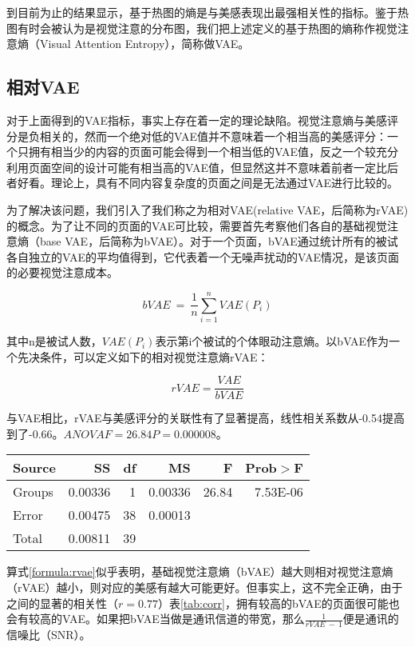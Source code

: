 到目前为止的结果显示，基于热图的熵是与美感表现出最强相关性的指标。鉴于热图有时会被认为是视觉注意的分布图，我们把上述定义的基于热图的熵称作视觉注意熵（Visual Attention Entropy），简称做VAE。

\subsection{相对VAE}
对于上面得到的VAE指标，事实上存在着一定的理论缺陷。视觉注意熵与美感评分是负相关的，然而一个绝对低的VAE值并不意味着一个相当高的美感评分：一个只拥有相当少的内容的页面可能会得到一个相当低的VAE值，反之一个较充分利用页面空间的设计可能有相当高的VAE值，但显然这并不意味着前者一定比后者好看。理论上，具有不同内容复杂度的页面之间是无法通过VAE进行比较的。

为了解决该问题，我们引入了我们称之为相对VAE(relative VAE，后简称为rVAE)的概念。为了让不同的页面的VAE可比较，需要首先考察他们各自的基础视觉注意熵（base VAE，后简称为bVAE）。对于一个页面，bVAE通过统计所有的被试各自独立的VAE的平均值得到，它代表着一个无噪声扰动的VAE情况，是该页面的必要视觉注意成本。

$$bVAE~=~\frac{1}{n}\sum_{i=1}^n VAE(P_i)$$

其中n是被试人数，$VAE(P_i)$表示第i个被试的个体眼动注意熵。以bVAE作为一个先决条件，可以定义如下的相对视觉注意熵rVAE：

\begin{equation}
rVAE = \frac{VAE}{bVAE}
\label{formula:rvae}
\end{equation}

与VAE相比，rVAE与美感评分的关联性有了显著提高，线性相关系数从-0.54提高到了-0.66。$ANOVA F = 26.84 P = 0.000008$。

\begin{table}[H]
\centering
\begin{tabular}{lrrrrr}
  \hline
  Source&SS&df&MS&F&Prob$>$F\\ \hline
  Groups&0.00336&1&0.00336&26.84&7.53E-06\\
  Error&0.00475&38&0.00013&&\\
  Total&0.00811&39&&&\\
  \hline
\end{tabular}
\end{table}

算式\ref{formula:rvae}似乎表明，基础视觉注意熵（bVAE）越大则相对视觉注意熵（rVAE）越小，则对应的美感有越大可能更好。但事实上，这不完全正确，由于之间的显著的相关性（$r = 0.77$）表\ref{tab:corr}，拥有较高的bVAE的页面很可能也会有较高的VAE。如果把bVAE当做是通讯信道的带宽，那么$\frac{1}{{rVAE} ~-~ 1}$便是通讯的信噪比（SNR）。

